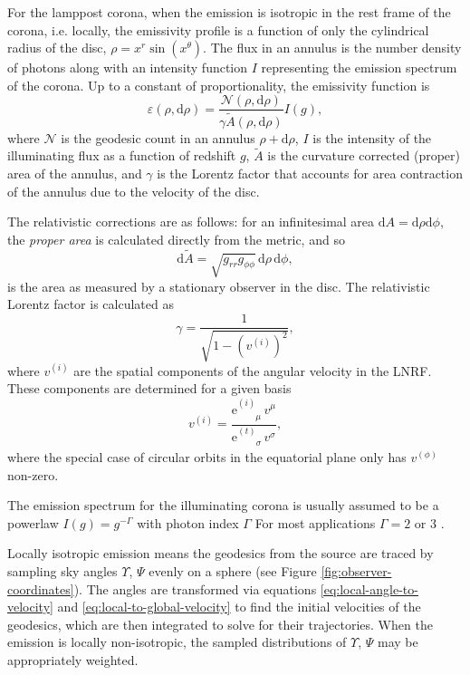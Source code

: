 \documentclass[fleqn,usenatbib]{mnras}
\newcommand{\e}{\text{e}}
\renewcommand{\d}{\text{d}}
\newcommand{\utensor}[3]{#1^{#2}_{\phantom{#2}#3}}
\begin{document}
For the lamppost corona, when the emission is isotropic in the rest
frame of the corona, i.e. locally, the emissivity profile is a function of only the
cylindrical radius of the disc, $\rho = x^r \sin(x^\theta)$. The flux in an
annulus is the number density of photons along with an intensity function $I$
representing the emission spectrum of the corona. Up to a constant of
proportionality, the emissivity function is
\begin{equation}
    \varepsilon (\rho, \d \rho) = \frac{\mathcal{N}(\rho, \d \rho)}{\gamma
    \tilde{A}(\rho, \d \rho)} I(g),
\end{equation}
where $\mathcal{N}$ is the geodesic count in an annulus $\rho + \d \rho$, $I$ is
the intensity of the illuminating flux as a function of redshift $g$,
$\tilde{A}$ is the curvature corrected (proper) area of the annulus, and
$\gamma$ is the Lorentz factor that accounts for area contraction of the annulus
due to the velocity of the disc.

The relativistic corrections are as follows: for an infinitesimal area $\d A = \d
\rho\d\phi$, the \textit{proper area} is calculated directly from the metric,
and so
\begin{equation}
    \d\tilde{A} = \sqrt{g_{rr} g_{\phi\phi}}\, \d \rho\, \d \phi,
\end{equation}
is the area as measured by a stationary observer in the disc. The relativistic
Lorentz factor is calculated as
\begin{equation}
    \gamma = \frac{1}{\sqrt{1 - \left(v^{(i)}\right)^2}},
\end{equation}
where $v^{(i)}$ are the spatial components of the angular velocity in the LNRF.
These components are determined for a given basis
\begin{equation}
    v^{(i)} = \frac{\utensor{\e}{(i)}{\mu}\, v^\mu}{\utensor{\e}{(t)}{\sigma}\, v^\sigma},
\end{equation}
where the special case of circular orbits in the equatorial plane only has
$v^{(\phi)}$ non-zero.

The emission spectrum for the illuminating corona is usually assumed to be a
powerlaw $I(g) = g^{-\Gamma}$ with photon index $\Gamma$ For most applications
$\Gamma = 2$ or $3$ \citep{mushotzky_agn_pl_1982,remillard_binaries_2006}.

Locally isotropic emission means the geodesics from the source are traced by
sampling sky angles $\Upsilon$, $\Psi$ evenly on a sphere (see Figure
\ref{fig:observer-coordinates}). The angles are transformed via equations
\eqref{eq:local-angle-to-velocity} and \eqref{eq:local-to-global-velocity} to
find the initial velocities of the geodesics, which are then integrated to solve for
their trajectories. When the emission is locally non-isotropic, the sampled
distributions of $\Upsilon$, $\Psi$ may be appropriately weighted.
\end{document}

